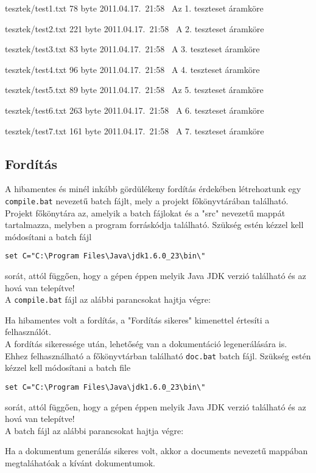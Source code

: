 \begin{fajllista}
\fajl
{tesztek/test1.txt} %
{78 byte} %
{2011.04.17.~21:58~} %
{Az 1. teszteset áramköre} %

\fajl
{tesztek/test2.txt} %
{221 byte} %
{2011.04.17.~21:58~} %
{A 2. teszteset áramköre} %

\fajl
{tesztek/test3.txt} %
{83 byte} %
{2011.04.17.~21:58~} %
{A 3. teszteset áramköre} %

\fajl
{tesztek/test4.txt} %
{96 byte} %
{2011.04.17.~21:58~} %
{A 4. teszteset áramköre} %

\fajl
{tesztek/test5.txt} %
{89 byte} %
{2011.04.17.~21:58~} %
{Az 5. teszteset áramköre} %

\fajl
{tesztek/test6.txt} %
{263 byte} %
{2011.04.17.~21:58~} %
{A 6. teszteset áramköre} %

\fajl
{tesztek/test7.txt} %
{161 byte} %
{2011.04.17.~21:58~} %
{A 7. teszteset áramköre} %

\end{fajllista}

\subsection{Fordítás}
A hibamentes és minél inkább gördülékeny fordítás érdekében létrehoztunk egy \texttt{compile.bat} nevezetű batch fájlt, mely a projekt főkönyvtárában található. Projekt főkönytára az, amelyik a batch fájlokat és a "src" nevezetű mappát tartalmazza, melyben a program forráskódja található. Szükség estén kézzel kell módosítani a batch fájl
\begin{verbatim}
set C="C:\Program Files\Java\jdk1.6.0_23\bin\"
\end{verbatim}
sorát, attól függően, hogy a gépen éppen melyik Java JDK verzió található és az hová van telepítve!\\
A \texttt{compile.bat} fájl az alábbi parancsokat hajtja végre:

Ha hibamentes volt a fordítás, a "Fordítás sikeres" kimenettel értesíti a felhasználót.\\
A fordítás sikeressége után, lehetőség van a dokumentáció legenerálására is. Ehhez felhasználható a főkönyvtárban található \texttt{doc.bat} batch fájl.
Szükség estén kézzel kell módosítani a batch file \begin{verbatim}
set C="C:\Program Files\Java\jdk1.6.0_23\bin\"
\end{verbatim}
sorát, attól függően, hogy a gépen éppen melyik Java JDK verzió található és az hová van telepítve!\\
A batch fájl az alábbi parancsokat hajtja végre:

Ha a dokumentum generálás sikeres volt, akkor a documents nevezetű mappában megtaláhatóak a kívánt dokumentumok.
